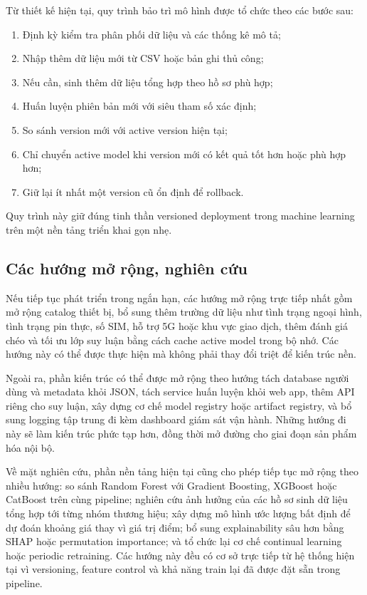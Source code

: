 Từ thiết kế hiện tại, quy trình bảo trì mô hình được tổ chức theo các bước sau:

\begin{enumerate}[label=\arabic*.]
    \item Định kỳ kiểm tra phân phối dữ liệu và các thống kê mô tả;
    \item Nhập thêm dữ liệu mới từ CSV hoặc bản ghi thủ công;
    \item Nếu cần, sinh thêm dữ liệu tổng hợp theo hồ sơ phù hợp;
    \item Huấn luyện phiên bản mới với siêu tham số xác định;
    \item So sánh version mới với active version hiện tại;
    \item Chỉ chuyển active model khi version mới có kết quả tốt hơn hoặc phù hợp hơn;
    \item Giữ lại ít nhất một version cũ ổn định để rollback.
\end{enumerate}

Quy trình này giữ đúng tinh thần versioned deployment trong machine learning trên một nền tảng triển khai gọn nhẹ.

\subsection{Các hướng mở rộng, nghiên cứu}


Nếu tiếp tục phát triển trong ngắn hạn, các hướng mở rộng trực tiếp nhất gồm mở rộng catalog thiết bị, bổ sung thêm trường dữ liệu như tình trạng ngoại hình, tình trạng pin thực, số SIM, hỗ trợ 5G hoặc khu vực giao dịch, thêm đánh giá chéo và tối ưu lớp suy luận bằng cách cache active model trong bộ nhớ. Các hướng này có thể được thực hiện mà không phải thay đổi triệt để kiến trúc nền.

Ngoài ra, phần kiến trúc có thể được mở rộng theo hướng tách database người dùng và metadata khỏi JSON, tách service huấn luyện khỏi web app, thêm API riêng cho suy luận, xây dựng cơ chế model registry hoặc artifact registry, và bổ sung logging tập trung đi kèm dashboard giám sát vận hành. Những hướng đi này sẽ làm kiến trúc phức tạp hơn, đồng thời mở đường cho giai đoạn sản phẩm hóa nội bộ.

Về mặt nghiên cứu, phần nền tảng hiện tại cũng cho phép tiếp tục mở rộng theo nhiều hướng: so sánh Random Forest với Gradient Boosting, XGBoost hoặc CatBoost trên cùng pipeline; nghiên cứu ảnh hưởng của các hồ sơ sinh dữ liệu tổng hợp tới từng nhóm thương hiệu; xây dựng mô hình ước lượng bất định để dự đoán khoảng giá thay vì giá trị điểm; bổ sung explainability sâu hơn bằng SHAP hoặc permutation importance; và tổ chức lại cơ chế continual learning hoặc periodic retraining. Các hướng này đều có cơ sở trực tiếp từ hệ thống hiện tại vì versioning, feature control và khả năng train lại đã được đặt sẵn trong pipeline.
